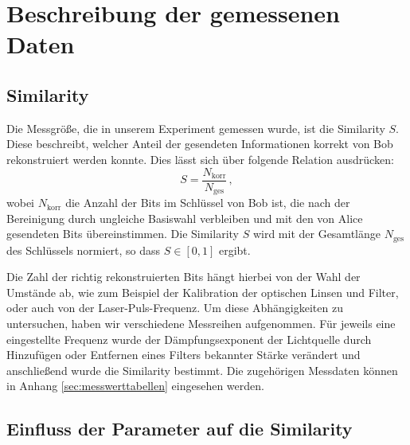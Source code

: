 \section{Beschreibung der gemessenen Daten}
\subsection{Similarity}
Die Messgröße, die in unserem Experiment gemessen wurde, ist die Similarity $S$.
Diese beschreibt, welcher Anteil der gesendeten Informationen korrekt von Bob
rekonstruiert werden konnte. Dies lässt sich über folgende Relation ausdrücken:
\begin{equation}
S = \frac{N_{\mathrm{korr}}}{N_{\mathrm{ges}}}\,,
\end{equation}
wobei $N_{\mathrm{korr}}$ die Anzahl der Bits im Schlüssel von Bob ist,
die nach der Bereinigung durch ungleiche Basiswahl verbleiben und mit den von
Alice gesendeten Bits übereinstimmen. Die Similarity $S$ wird mit der Gesamtlänge
$N_{\mathrm{ges}}$ des Schlüssels normiert, so dass $S \in [0,1]$ ergibt.

Die Zahl der richtig rekonstruierten Bits hängt hierbei von der Wahl der
Umstände ab, wie zum Beispiel der Kalibration der optischen Linsen und Filter, oder
auch von der Laser-Puls-Frequenz. Um diese Abhängigkeiten zu untersuchen, haben
wir verschiedene Messreihen aufgenommen. Für jeweils eine eingestellte Frequenz
wurde der Dämpfungsexponent der Lichtquelle durch Hinzufügen oder Entfernen eines Filters
bekannter Stärke verändert und anschließend wurde die Similarity bestimmt. Die
zugehörigen Messdaten können in Anhang \ref{sec:messwerttabellen} eingesehen
werden.




\subsection{Einfluss der Parameter auf die Similarity}

